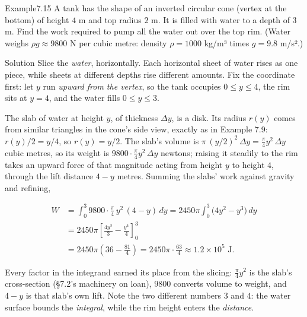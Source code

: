 \documentclass[a4paper,12pt,oneside]{memoir}
\begin{document}
\begin{workedexample}
\begin{envexample}{Example}{7.15}{}
A tank has the shape of an inverted circular cone (vertex at the bottom) of height \(4\) m and top radius \(2\) m. It is filled with water to a depth of \(3\) m. Find the work required to pump all the water out over the top rim. (Water weighs \(\rho g \approx 9800\) N per cubic metre: density \(\rho = 1000\) kg/m³ times \(g = 9.8\) m/s².)
\end{envexample}
\begin{envsolution}{Solution}{}{}
Slice the \emph{water}, horizontally. Each horizontal sheet of water rises as one piece, while sheets at different depths rise different amounts. Fix the coordinate first: let \(y\) run \emph{upward from the vertex}, so the tank occupies \(0 \le y \le 4\), the rim sits at \(y = 4\), and the water fills \(0 \le y \le 3\).

The slab of water at height \(y\), of thickness \(\Delta y\), is a disk. Its radius \(r(y)\) comes from similar triangles in the cone’s side view, exactly as in Example 7.9: \(r(y)/2 = y/4\), so \(r(y) = y/2\). The slab’s volume is \(\pi\,(y/2)^{2}\,\Delta y = \tfrac{\pi}{4}y^{2}\,\Delta y\) cubic metres, so its weight is \(9800\cdot\tfrac{\pi}{4}y^{2}\,\Delta y\) newtons; raising it steadily to the rim takes an upward force of that magnitude acting from height \(y\) to height \(4\), through the lift distance \(4 - y\) metres. Summing the slabs’ work against gravity and refining,

\[ \begin{aligned}
          W &= \int_{0}^{3} 9800\cdot\frac{\pi}{4}\,y^{2}\,(4 - y)\,dy = 2450\pi \int_{0}^{3} \bigl(4y^{2} - y^{3}\bigr)\,dy \\[2pt]
            &= 2450\pi \left[\frac{4y^{3}}{3} - \frac{y^{4}}{4}\right]_{0}^{3} \\[2pt]
            &= 2450\pi\left(36 - \frac{81}{4}\right) = 2450\pi\cdot\frac{63}{4} \approx 1.2 \times 10^{5} \text{ J}.
        \end{aligned} \]

Every factor in the integrand earned its place from the slicing: \(\tfrac{\pi}{4}y^{2}\) is the slab’s cross-section (§7.2’s machinery on loan), \(9800\) converts volume to weight, and \(4 - y\) is that slab’s own lift. Note the two different numbers \(3\) and \(4\): the water surface bounds the \emph{integral}, while the rim height enters the \emph{distance}. \qedmark
\end{envsolution}
\end{workedexample}
\end{document}
